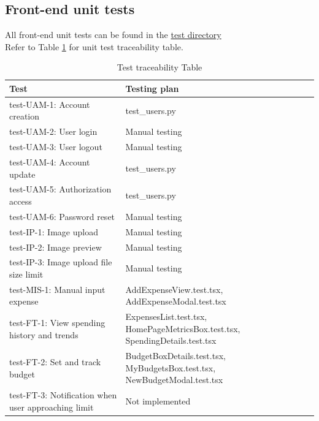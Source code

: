 \documentclass[12pt, titlepage]{article}
\begin{document}
\subsection{Front-end unit tests}

All front-end unit tests can be found in the \href{https://github.com/PlutosCapstone/Plutos/tree/main/src/client/tests}{test directory}\\
Refer to Table \ref{tab:unit-testing} for unit test traceability table.

\begin{table}[h!]
  \caption{Testing Table} \label{tab:unit-testing}
  \centering
  \renewcommand{\arraystretch}{1.3}
  \begin{tabular}{| m{5cm} | m{8cm} |}
      \hline
      \textbf{Test} & \textbf{Testing plan} \\
      \hline
      test-UAM-1: Account creation & test\_users.py \\
      \hline
      test-UAM-2: User login & Manual testing \\
      \hline
      test-UAM-3: User logout & Manual testing \\
      \hline
      test-UAM-4: Account update & test\_users.py \\
      \hline
      test-UAM-5: Authorization access & test\_users.py \\
      \hline
      test-UAM-6: Password reset & Manual testing \\
      \hline
      test-IP-1: Image upload & Manual testing \\
      \hline
      test-IP-2: Image preview & Manual testing \\
      \hline
      test-IP-3: Image upload file size limit & Manual testing \\
      \hline
      test-MIS-1: Manual input expense & AddExpenseView.test.tsx, AddExpenseModal.test.tsx \\
      \hline
      test-FT-1: View spending history and trends & ExpensesList.test.tsx, HomePageMetricsBox.test.tsx, SpendingDetails.test.tsx \\
      \hline
      test-FT-2: Set and track budget & BudgetBoxDetails.test.tsx, MyBudgetsBox.test.tsx, NewBudgetModal.test.tsx \\
      \hline
      test-FT-3: Notification when user approaching limit & Not implemented \\
      \hline
  \end{tabular}
  \caption{Test traceability Table} \label{tab:unit-testing}
\end{table}
\end{document}
